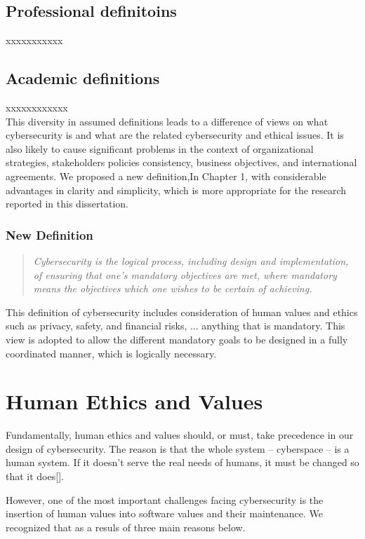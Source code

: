 \subsection{Professional definitoins}
xxxxxxxxxxx
\subsection{Academic definitions}
xxxxxxxxxxxx
\\

This diversity in assumed definitions leads to a difference of views on what cybersecurity is and what are the related cybersecurity and ethical issues. It is also likely to cause significant problems in the context of organizational strategies, stakeholders policies consistency, business objectives, and international agreements. We proposed a new definition,In Chapter 1, with considerable advantages in clarity and simplicity, 
which is more appropriate for the research reported in this dissertation.

\subsubsection*{New Definition}
\begin{quote} \em Cybersecurity is the logical process, including design and implementation, of ensuring that one's mandatory objectives are met, where mandatory means the objectives which one wishes to be certain of achieving.\end{quote}

This definition of cybersecurity includes consideration of human values and ethics such as privacy, safety, and financial risks, ... anything that is mandatory. This view is adopted to allow the different mandatory goals
to be designed in a fully coordinated manner, which is logically necessary.

\section{Human Ethics and Values}
Fundamentally, human ethics and values should, or must, take precedence in our design of cybersecurity. The reason is that the whole system -- cyberspace -- is a human system. If it doesn't serve the real needs of humans, it must be changed so that it does[]. 

However, one of the most important challenges facing cybersecurity is the insertion of human values into software values and their maintenance.  We recognized  that as a resuls of three  main reasons below. 
